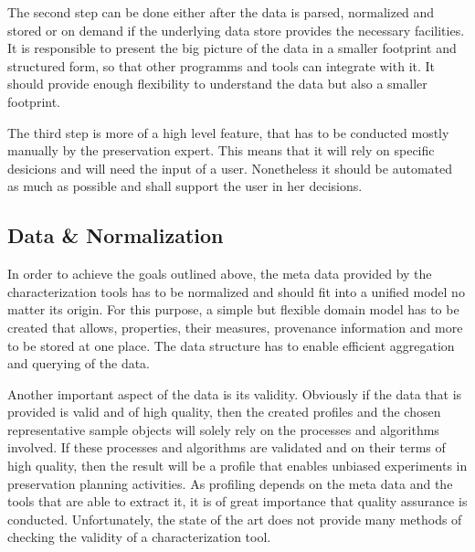 The second step can be done either after the data is parsed, normalized and stored or on demand if the underlying data store provides the necessary facilities. It is responsible to present the big picture of the data in a smaller footprint and structured form, so that other programms and tools can integrate with it. It should provide enough flexibility to understand the data but also a smaller footprint.

The third step is more of a high level feature, that has to be conducted mostly manually by the preservation expert. This means that it will rely on specific desicions and will need the input of a user. Nonetheless it should be automated as much as possible and shall support the user in her decisions.


\subsection{Data \& Normalization}
In order to achieve the goals outlined above, the meta data provided by the characterization tools has to be normalized and should fit into a unified model no matter its origin. For this purpose, a simple but flexible domain model has to be created that allows, properties, their measures, provenance information and more to be stored at one place.
The data structure has to enable efficient aggregation and querying of the data. 

Another important aspect of the data is its validity. Obviously if the data that is provided is valid and of high quality, then the created profiles and the chosen representative sample objects will solely rely on the processes and algorithms involved. If these processes and algorithms are validated and on their terms of high quality, then the result will be a profile that enables unbiased experiments in preservation planning activities. As profiling depends on the meta data and the tools that are able to extract it, it is of great importance that quality assurance is conducted. Unfortunately, the state of the art does not provide many methods of checking the validity of a characterization tool. %

